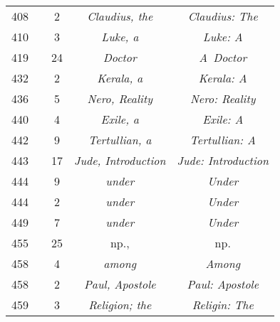 \documentclass[a4paper,11pt]{article}
\begin{document}
\begin{center}
\begin{tabular}{|c|c|c|c|c|}
    408 & &  2 & \textit{Claudius, the} & \textit{Claudius: The} \\
    410 & &  3 & \textit{Luke, a} & \textit{Luke: A} \\
    419 & & 24 & \textit{Doctor} & \textit{A~Doctor} \\
    432 & &  2 & \textit{Kerala, a} & \textit{Kerala: A} \\
    436 & &  5 & \textit{Nero, Reality} & \textit{Nero: Reality} \\
    440 & &  4 & \textit{Exile, a} & \textit{Exile: A} \\
    442 & &  9 & \textit{Tertullian, a} & \textit{Tertullian: A} \\
    443 & & 17 & \textit{Jude, Introduction}
           & \textit{Jude: Introduction} \\
    444 & &  9 & \textit{under} & \textit{Under} \\
    444 & &  2 & \textit{under} & \textit{Under} \\
    449 & &  7 & \textit{under} & \textit{Under} \\
    455 & & 25 & np., & np. \\
    458 & &  4 & \textit{among} & \textit{Among} \\
    458 & &  2 & \textit{Paul, Apostole} & \textit{Paul: Apostole} \\
    459 & &  3 & \textit{Religion; the} & \textit{Religin: The} \\
    \hline
  \end{tabular}






\end{center}
\end{document}
